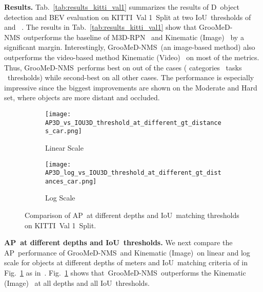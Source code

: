 \documentclass[final]{cvpr}
\newcommand{\myReferTable}[1]{Tab.~\ref{#1}}
\newcommand{\myReferFigure}[1]{Fig.~\ref{#1}}
\newcommand{\methodName}{GrooMeD-NMS}
\newcommand{\kinematicImage}{Kinematic (Image)}
\newcommand{\kinematicVideo}{Kinematic (Video)}
\newcommand{\iou}{IoU}
\newcommand{\threeD}{D}
\newcommand{\iouThreeD}{\iou}
\newcommand{\ap}{AP}
\newcommand{\apthreeD}{\ap}
\newcommand{\kitti}{KITTI}
\newcommand{\valOne}{Val 1}
\begin{document}
\noindent\textbf{Results.}
            \myReferTable{tab:results_kitti_val1} summarizes the results of \threeD~object detection and BEV evaluation on \kitti~\valOne~Split at two \iouThreeD~thresholds of  and ~\cite{chen2020monopair,brazil2020kinematic}. 
            The results in \myReferTable{tab:results_kitti_val1} show that \methodName~outperforms the baseline of M3D-RPN~\cite{brazil2019m3d} and \kinematicImage~\cite{brazil2020kinematic} by a significant margin. 
            Interestingly, \methodName~(an image-based method) also outperforms the video-based method \kinematicVideo~\cite{brazil2020kinematic} on most of the metrics. 
            Thus, \methodName~performs best on  out of the  cases ( categories ~tasks ~thresholds) while second-best on all other cases. 
            The performance is especially impressive since the biggest improvements are shown on the Moderate and Hard set, where objects are more distant and occluded.

        \begin{figure}[!tb]
            \centering
            \begin{subfigure}{.5\linewidth}
              \centering
              \texttt{[image: AP3D\_vs\_IOU3D\_threshold\_at\_different\_gt\_distances\_car.png]}
              \caption{Linear Scale}
            \end{subfigure}\begin{subfigure}{.5\linewidth}
              \centering
              \texttt{[image: AP3D\_log\_vs\_IOU3D\_threshold\_at\_different\_gt\_distances\_car.png]}
              \caption{Log Scale}
            \end{subfigure}
            \caption{Comparison of \apthreeD~at different depths and \iouThreeD~matching thresholds on \kitti~\valOne~Split.}
            \label{fig:ap_ground_truth_threshold}
        \end{figure}

\noindent\textbf{\apthreeD~at different depths and \iouThreeD~thresholds.}
            We next compare the \apthreeD~performance of \methodName~and \kinematicImage~on linear and log scale for objects at different depths of  meters and \iouThreeD~matching criteria of  in \myReferFigure{fig:ap_ground_truth_threshold} as in~\cite{brazil2020kinematic}. 
            \myReferFigure{fig:ap_ground_truth_threshold} shows that~\methodName~outperforms the \kinematicImage~\cite{brazil2020kinematic} at all depths and all \iouThreeD~thresholds.
    
\end{document}
